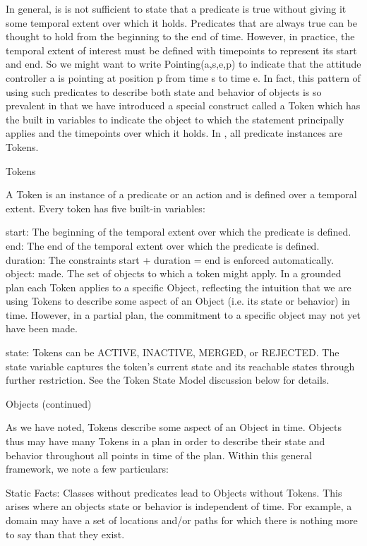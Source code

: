 In general, is is not sufficient to state that a predicate is true
without giving it some temporal extent over which it holds. Predicates
that are always true can be thought to hold from the beginning to the
end of time. However, in practice, the temporal extent of interest
must be defined with timepoints to represent its start and end. So we
might want to write Pointing(a,s,e,p) to indicate that the attitude
controller a is pointing at position p from time s to time e. In fact,
this pattern of using such predicates to describe both state and
behavior of objects is so prevalent in \eu that we have introduced
a special construct called a Token which has the built in variables to
indicate the object to which the statement principally applies and the
timepoints over which it holds. In \eu, all predicate instances are
Tokens.

Tokens

A Token is an instance of a predicate or an action and is defined over
a temporal extent. Every token has five built-in variables:

start: The beginning of the temporal extent over which the predicate
is defined.  end: The end of the temporal extent over which the
predicate is defined.  duration: The constraints start + duration =
end is enforced automatically.  object: made. The set of objects to
which a token might apply. In a grounded plan each Token applies to a
specific Object, reflecting the intuition that we are using Tokens to
describe some aspect of an Object (i.e. its state or behavior) in
time. However, in a partial plan, the commitment to a specific object
may not yet have been made.

state: Tokens can be ACTIVE, INACTIVE, MERGED, or REJECTED. The state
variable captures the token's current state and its reachable states
through further restriction. See the Token State Model discussion
below for details.

Objects (continued)

As we have noted, Tokens describe some aspect of an Object in
time. Objects thus may have many Tokens in a plan in order to describe
their state and behavior throughout all points in time of the
plan. Within this general framework, we note a few particulars:

Static Facts: Classes without predicates lead to Objects without
Tokens. This arises where an objects state or behavior is independent
of time. For example, a domain may have a set of locations and/or
paths for which there is nothing more to say than that they exist.


